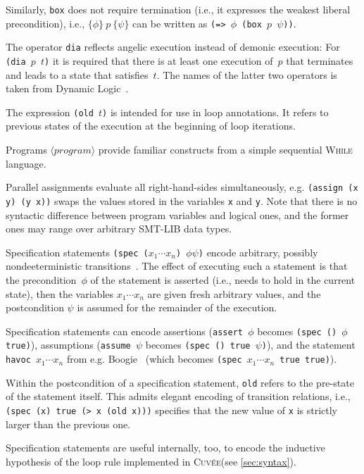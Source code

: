 \documentclass[fleqn]{llncs}
\newcommand{\Cuvee}{\textsc{Cuvée}\xspace}
\newcommand{\code}[1]{\texttt{#1}}
\newcommand{\hoare}[3]{\{ #1 \}~#2~\{ #3 \}}
\newcommand{\nonterminal}[1]{\ensuremath{\langle \mathit{#1} \rangle}}
\begin{document}
Similarly, \code{box} does not require termination (i.e., it expresses the weakest liberal precondition),
i.e., $\hoare{\phi}{p}{\psi}$ can be written as \code{(=> $\phi$ (box $p$ $\psi$))}.

The operator \code{dia} reflects angelic execution instead of demonic execution:
For \code{(dia $p$ $t$)} it is required that there is at least one execution of~$p$
that terminates and leads to a state that satisfies~$t$.
The names of the latter two operators is taken from Dynamic Logic~\cite{}.

The expression \code{(old $t$)} is intended for use in loop annotations.
It refers to previous states of the execution at the beginning of loop iterations.

\medskip

Programs \nonterminal{program} provide familiar constructs from a simple sequential \textsc{While} language.

Parallel assignments evaluate all right-hand-sides simultaneously,
e.g. \code{(assign (x y)  (y x))} swaps the values stored in the variables \code{x} and \code{y}.
Note that there is no syntactic difference between program variables and logical ones,
and the former ones may range over arbitrary SMT-LIB data types.

Specification statements \code{(spec ($x_1 \cdots x_n$) $\phi \psi$)}
encode arbitrary, possibly nondeeterministic transitions~\cite{}.
The effect of executing such a statement is that the precondition~$\phi$ of the statement
is asserted (i.e., needs to hold in the current state),
then the variables \code{$x_1 \cdots x_n$} are given fresh arbitrary values,
and the postcondition $\psi$ is assumed for the remainder of the execution.

Specification statements can encode assertions (\code{assert $\phi$} becomes \code{(spec () $\phi$ true)}),
assumptions (\code{assume $\psi$} becomes \code{(spec () true $\psi$)}),
and the statement \code{havoc $x_1 \cdots x_n$} from e.g. Boogie~\cite{}
(which becomes \code{(spec $x_1 \cdots x_n$ true true)}).

Within the postcondition of a specification statement, \code{old} refers to the pre-state of the statement itself.
This admits elegant encoding of transition relations,
i.e., \code{(spec (x) true (> x (old x)))} specifies that the new value of \code{x} is strictly larger than the previous one.

Specification statements are useful internally, too, to encode the inductive hypothesis of the loop rule implemented in \Cuvee (see \cref{sec:syntax}).
\end{document}

